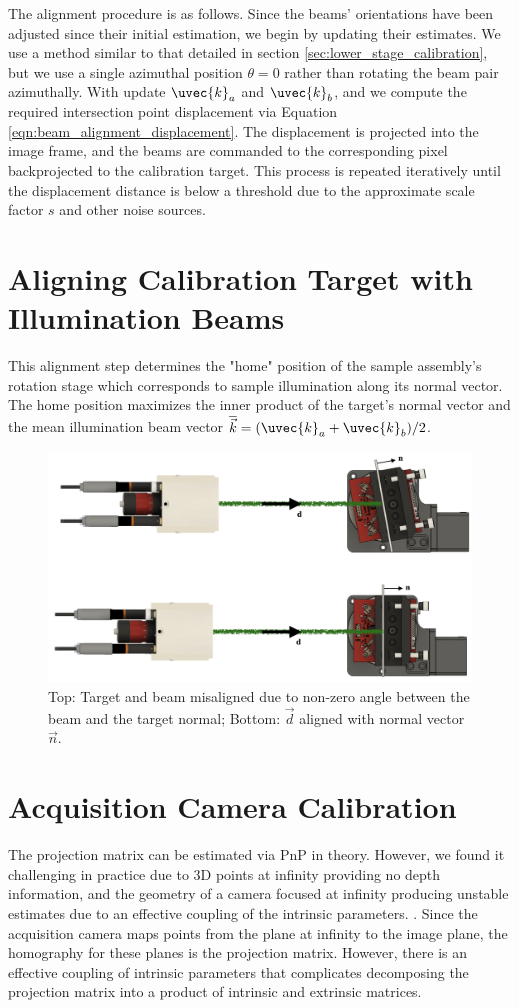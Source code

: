 The alignment procedure is as follows. Since the beams' orientations have been adjusted since their initial estimation, we begin by updating their estimates. We use a method similar to that detailed in section \ref{sec:lower_stage_calibration}, but we use a single azimuthal position $\theta = 0$ rather than rotating the beam pair azimuthally. With update $\uvec{k}_a$ and $\uvec{k}_b$, and we compute the required intersection point displacement via Equation \ref{eqn:beam_alignment_displacement}. The displacement is projected into the image frame, and the beams are commanded to the corresponding pixel backprojected to the calibration target. This process is repeated iteratively until the displacement distance is below a threshold due to the approximate scale factor $s$ and other noise sources.

\section{Aligning Calibration Target with Illumination Beams}
This alignment step determines the "home" position of the sample assembly's rotation stage which corresponds to sample illumination along its normal vector. The home position maximizes the inner product of the target's normal vector and the mean illumination beam vector $\overline{\vec{k}} = (\uvec{k}_a + \uvec{k}_b)/2$.
\begin{figure}
    \centering
    \includegraphics[width=0.5\linewidth]{../figures/target_alignment.png}
    \caption{Top: Target and beam misaligned due to non-zero angle between the beam and the target normal; Bottom: $\vec{d}$ aligned with normal vector $\vec{n}$. }
    \label{fig:sample_beam_alignment}
\end{figure}

\section{Acquisition Camera Calibration}
The projection matrix can be estimated via PnP in theory. However, we found it challenging in practice due to 3D points at infinity providing no depth information, and the geometry of a camera focused at infinity producing unstable estimates due to an effective coupling of the intrinsic parameters. . Since the acquisition camera maps points from the plane at infinity to the image plane, the homography for these planes is the projection matrix. However, there is an effective coupling of intrinsic parameters that complicates decomposing the projection matrix into a product of intrinsic and extrinsic matrices. 

